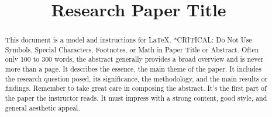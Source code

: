 \documentclass[conference]{IEEEtran}
\begin{document}

\title{Research Paper Title
}

\author{
}

\maketitle

\begin{abstract}
This document is a model and instructions for \LaTeX.
*CRITICAL: Do Not Use Symbols, Special Characters, Footnotes, or Math in Paper Title or Abstract.
Often only 100 to 300 words, the abstract generally provides a broad overview and is never more than a page.
It describes the essence, the main theme of the paper. It includes the research question posed, its significance,
the methodology, and the main results or findings. Remember to take great care in composing the abstract. It's the
first part of the paper the instructor reads. It must impress with a strong content, good style, and general aesthetic appeal.
\end{abstract}
\end{document}
